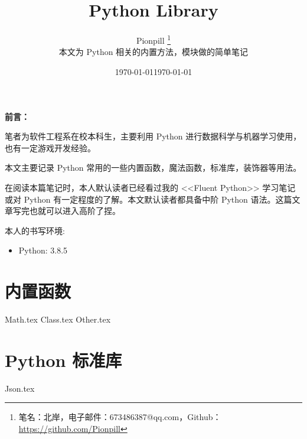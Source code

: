 \documentclass{PionpillNote-book}
\title{Python Library}
\author{
    Pionpill \footnote{笔名：北岸，电子邮件：673486387@qq.com，Github：\url{https://github.com/Pionpill}} \\
    本文为 Python 相关的内置方法，模块做的简单笔记\\
}
\date{\today}
\begin{document}
\pagestyle{plain}
\maketitle

\noindent\textbf{前言：}

笔者为软件工程系在校本科生，主要利用 Python 进行数据科学与机器学习使用，也有一定游戏开发经验。

本文主要记录 Python 常用的一些内置函数，魔法函数，标准库，装饰器等用法。

在阅读本篇笔记时，本人默认读者已经看过我的 <<Fluent Python>> 学习笔记或对 Python 有一定程度的了解。本文默认读者都具备中阶 Python 语法。这篇文章写完也就可以进入高阶了捏。

本人的书写环境:
\begin{itemize}
    \item Python: 3.8.5
\end{itemize}

\date{\today}
\tableofcontents
\newpage

\setcounter{page}{1} 
\pagestyle{fancy}

\part{内置函数}
{Math.tex}
{Class.tex}
{Other.tex}

\part{Python 标准库}
{Json.tex}
\end{document}
